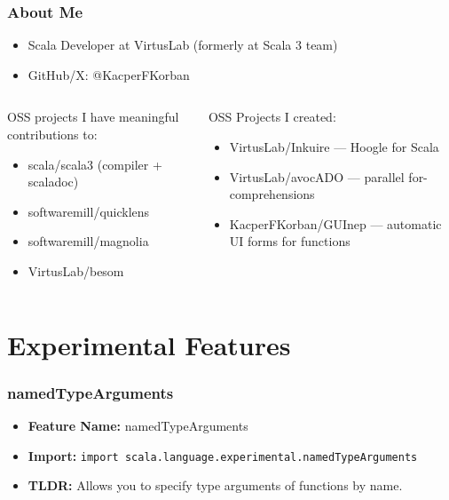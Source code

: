 \documentclass{beamer}
\begin{document}
\begin{frame}
  \frametitle{About Me}

  \begin{itemize}
    \item Scala Developer at VirtusLab (formerly at Scala 3 team)
    \item GitHub/X: @KacperFKorban
  \end{itemize}

  \vspace{1cm}

  \begin{columns}[T]
    \begin{column}{.5\textwidth}
      OSS projects I have meaningful contributions to:
      \begin{itemize}
        \item scala/scala3 (compiler + scaladoc)
        \item softwaremill/quicklens
        \item softwaremill/magnolia
        \item VirtusLab/besom
      \end{itemize}
    \end{column}

    \begin{column}{.5\textwidth}
      OSS Projects I created:
      \begin{itemize}
        \item VirtusLab/Inkuire --- Hoogle for Scala
        \item VirtusLab/avocADO --- parallel for-comprehensions
        \item KacperFKorban/GUInep --- automatic UI forms for functions
      \end{itemize}
    \end{column}
  \end{columns}
\end{frame}

\section{Experimental Features}

\begin{frame}[fragile]
  \frametitle{namedTypeArguments}
  \begin{itemize}
    \item \textbf{Feature Name:} namedTypeArguments
    \item \textbf{Import:} \texttt{import scala.language.experimental.namedTypeArguments}
    \item \textbf{TLDR:} Allows you to specify type arguments of functions by name.
  \end{itemize}
\end{frame}
\end{document}
